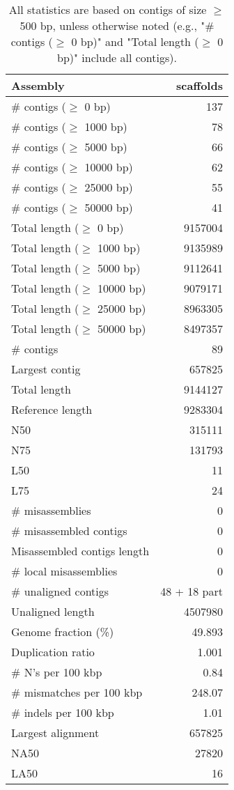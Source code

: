 \documentclass[12pt,a4paper]{article}
\begin{document}
\begin{table}[ht]
\begin{center}
\caption{All statistics are based on contigs of size $\geq$ 500 bp, unless otherwise noted (e.g., "\# contigs ($\geq$ 0 bp)" and "Total length ($\geq$ 0 bp)" include all contigs).}
\begin{tabular}{|l*{1}{|r}|}
\hline
Assembly & scaffolds \\ \hline
\# contigs ($\geq$ 0 bp) & 137 \\ \hline
\# contigs ($\geq$ 1000 bp) & 78 \\ \hline
\# contigs ($\geq$ 5000 bp) & 66 \\ \hline
\# contigs ($\geq$ 10000 bp) & 62 \\ \hline
\# contigs ($\geq$ 25000 bp) & 55 \\ \hline
\# contigs ($\geq$ 50000 bp) & 41 \\ \hline
Total length ($\geq$ 0 bp) & 9157004 \\ \hline
Total length ($\geq$ 1000 bp) & 9135989 \\ \hline
Total length ($\geq$ 5000 bp) & 9112641 \\ \hline
Total length ($\geq$ 10000 bp) & 9079171 \\ \hline
Total length ($\geq$ 25000 bp) & 8963305 \\ \hline
Total length ($\geq$ 50000 bp) & 8497357 \\ \hline
\# contigs & 89 \\ \hline
Largest contig & 657825 \\ \hline
Total length & 9144127 \\ \hline
Reference length & 9283304 \\ \hline
N50 & 315111 \\ \hline
N75 & 131793 \\ \hline
L50 & 11 \\ \hline
L75 & 24 \\ \hline
\# misassemblies & 0 \\ \hline
\# misassembled contigs & 0 \\ \hline
Misassembled contigs length & 0 \\ \hline
\# local misassemblies & 0 \\ \hline
\# unaligned contigs & 48 + 18 part \\ \hline
Unaligned length & 4507980 \\ \hline
Genome fraction (\%) & 49.893 \\ \hline
Duplication ratio & 1.001 \\ \hline
\# N's per 100 kbp & 0.84 \\ \hline
\# mismatches per 100 kbp & 248.07 \\ \hline
\# indels per 100 kbp & 1.01 \\ \hline
Largest alignment & 657825 \\ \hline
NA50 & 27820 \\ \hline
LA50 & 16 \\ \hline
\end{tabular}
\end{center}
\end{table}
\end{document}
